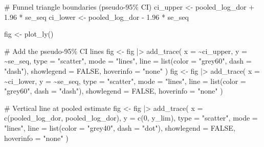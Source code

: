 \documentclass[
  letterpaper,
  DIV=11,
  numbers=noendperiod]{scrartcl}
\newenvironment{Shaded}{\begin{snugshade}}{\end{snugshade}}
\newcommand{\AttributeTok}[1]{\textcolor[rgb]{0.40,0.45,0.13}{#1}}
\newcommand{\CommentTok}[1]{\textcolor[rgb]{0.37,0.37,0.37}{#1}}
\newcommand{\ConstantTok}[1]{\textcolor[rgb]{0.56,0.35,0.01}{#1}}
\newcommand{\DecValTok}[1]{\textcolor[rgb]{0.68,0.00,0.00}{#1}}
\newcommand{\FloatTok}[1]{\textcolor[rgb]{0.68,0.00,0.00}{#1}}
\newcommand{\FunctionTok}[1]{\textcolor[rgb]{0.28,0.35,0.67}{#1}}
\newcommand{\NormalTok}[1]{\textcolor[rgb]{0.00,0.23,0.31}{#1}}
\newcommand{\OtherTok}[1]{\textcolor[rgb]{0.00,0.23,0.31}{#1}}
\newcommand{\SpecialCharTok}[1]{\textcolor[rgb]{0.37,0.37,0.37}{#1}}
\newcommand{\StringTok}[1]{\textcolor[rgb]{0.13,0.47,0.30}{#1}}
\newcounter{none} %
\begin{document}
\begin{Shaded}
\begin{Highlighting}[]
\CommentTok{\# Funnel triangle boundaries (pseudo{-}95\% CI)}
\NormalTok{ci\_upper }\OtherTok{\textless{}{-}}\NormalTok{ pooled\_log\_dor }\SpecialCharTok{+} \FloatTok{1.96} \SpecialCharTok{*}\NormalTok{ se\_seq}
\NormalTok{ci\_lower }\OtherTok{\textless{}{-}}\NormalTok{ pooled\_log\_dor }\SpecialCharTok{{-}} \FloatTok{1.96} \SpecialCharTok{*}\NormalTok{ se\_seq}

\NormalTok{fig }\OtherTok{\textless{}{-}} \FunctionTok{plot\_ly}\NormalTok{()}

\CommentTok{\# Add the pseudo{-}95\% CI lines}
\NormalTok{fig }\OtherTok{\textless{}{-}}\NormalTok{ fig }\SpecialCharTok{|\textgreater{}} \FunctionTok{add\_trace}\NormalTok{(}
  \AttributeTok{x =} \SpecialCharTok{\textasciitilde{}}\NormalTok{ci\_upper, }\AttributeTok{y =} \SpecialCharTok{\textasciitilde{}}\NormalTok{se\_seq,}
  \AttributeTok{type =} \StringTok{"scatter"}\NormalTok{, }\AttributeTok{mode =} \StringTok{"lines"}\NormalTok{,}
  \AttributeTok{line =} \FunctionTok{list}\NormalTok{(}\AttributeTok{color =} \StringTok{"grey60"}\NormalTok{, }\AttributeTok{dash =} \StringTok{"dash"}\NormalTok{),}
  \AttributeTok{showlegend =} \ConstantTok{FALSE}\NormalTok{,}
  \AttributeTok{hoverinfo =} \StringTok{"none"}
\NormalTok{)}
\NormalTok{fig }\OtherTok{\textless{}{-}}\NormalTok{ fig }\SpecialCharTok{|\textgreater{}} \FunctionTok{add\_trace}\NormalTok{(}
  \AttributeTok{x =} \SpecialCharTok{\textasciitilde{}}\NormalTok{ci\_lower, }\AttributeTok{y =} \SpecialCharTok{\textasciitilde{}}\NormalTok{se\_seq,}
  \AttributeTok{type =} \StringTok{"scatter"}\NormalTok{, }\AttributeTok{mode =} \StringTok{"lines"}\NormalTok{,}
  \AttributeTok{line =} \FunctionTok{list}\NormalTok{(}\AttributeTok{color =} \StringTok{"grey60"}\NormalTok{, }\AttributeTok{dash =} \StringTok{"dash"}\NormalTok{),}
  \AttributeTok{showlegend =} \ConstantTok{FALSE}\NormalTok{,}
  \AttributeTok{hoverinfo =} \StringTok{"none"}
\NormalTok{)}

\CommentTok{\# Vertical line at pooled estimate}
\NormalTok{fig }\OtherTok{\textless{}{-}}\NormalTok{ fig }\SpecialCharTok{|\textgreater{}} \FunctionTok{add\_trace}\NormalTok{(}
  \AttributeTok{x =} \FunctionTok{c}\NormalTok{(pooled\_log\_dor, pooled\_log\_dor), }\AttributeTok{y =} \FunctionTok{c}\NormalTok{(}\DecValTok{0}\NormalTok{, y\_lim),}
  \AttributeTok{type =} \StringTok{"scatter"}\NormalTok{, }\AttributeTok{mode =} \StringTok{"lines"}\NormalTok{,}
  \AttributeTok{line =} \FunctionTok{list}\NormalTok{(}\AttributeTok{color =} \StringTok{"grey40"}\NormalTok{, }\AttributeTok{dash =} \StringTok{"dot"}\NormalTok{),}
  \AttributeTok{showlegend =} \ConstantTok{FALSE}\NormalTok{,}
  \AttributeTok{hoverinfo =} \StringTok{"none"}
\NormalTok{)}


\end{Highlighting}
\end{Shaded}
\end{document}
